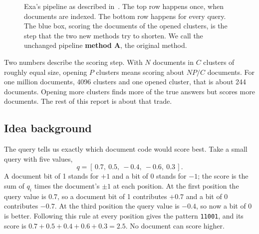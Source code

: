 \begin{figure}[H]\centering
{}
\caption{Exa's pipeline as described in~\cite{exa}. The top row happens once, when documents
are indexed. The bottom row happens for every query. The blue box, scoring the documents of
the opened clusters, is the step that the two new methods try to shorten. We call the
unchanged pipeline \textbf{method A}, the original method.}
\label{fig:pipeline}
\end{figure}

Two numbers describe the scoring step. With $N$ documents in $C$ clusters of roughly equal
size, opening $P$ clusters means scoring about $NP/C$ documents. For one million documents,
4096 clusters and one opened cluster, that is about 244 documents. Opening more clusters finds
more of the true answers but scores more documents. The rest of this report is about that
trade.

\subsection{Idea background}
The query tells us exactly which document code would score best. Take a small query with
five values,
\[
 q=[\,0.7,\ 0.5,\ -0.4,\ -0.6,\ 0.3\,].
\]
A document bit of 1 stands for $+1$ and a bit of 0 stands for $-1$; the score is the sum of
$q_i$ times the document's $\pm1$ at each position. At the first position the query value is
$0.7$, so a document bit of 1 contributes $+0.7$ and a bit of 0 contributes $-0.7$. At the
third position the query value is $-0.4$, so now a bit of 0 is better. Following this rule at
every position gives the pattern \texttt{11001}, and its score is
$0.7+0.5+0.4+0.6+0.3=2.5$. No document can score higher.

